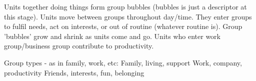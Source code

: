 







Units together doing things form group bubbles (bubbles is just a descriptor at this stage).
Units move between groups throughout day/time. 
They enter groups to fulfil needs, act on interests, or out of routine (whatever routine is).
Group 'bubbles' grow and shrink as units come and go.
Units who enter work group/business group contribute to productivity. 

Group types - as in family, work, etc:
Family, living, support
Work, company, productivity
Friends, interests, fun, belonging



